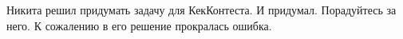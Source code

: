 Никита решил придумать задачу для КекКонтеста. И придумал. Порадуйтесь за него. К сожалению в его решение прокралась ошибка.